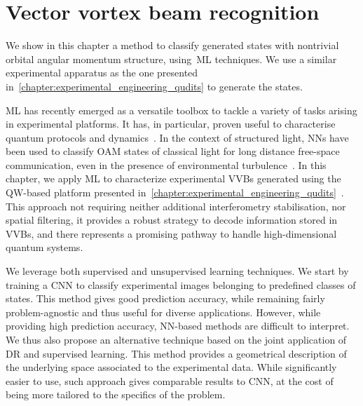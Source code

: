 
\chapter{Vector vortex beam recognition}
\label{chapter:ML_VVBs}

We show in this chapter a method to classify generated states with nontrivial orbital angular momentum structure, using~\acf{ML} techniques. We use a similar experimental apparatus as the one presented in~\cref{chapter:experimental_engineering_qudits} to generate the states.

\acf{ML} has recently emerged as a versatile toolbox to tackle a variety of tasks arising in experimental platforms. It has, in particular, proven useful to characterise quantum protocols and dynamics~\cite{carrasquilla2019reconstructing,giordani2018experimental, agresti2019pattern,lumino2018experimental,rocchetto2019experimental,butler2018machine,fischer2006predicting,melnikov2018active,wang2017experimental}.
In the context of structured light, \acfp{NN} have been used to classify \ac{OAM} states of classical light for long distance free-space communication, even in the presence of environmental turbulence~\cite{krenn2014communication,krenn2016twisted,doster2017machine,park2018demultiplexing,lohani2018turbulence,li2018joint}.
In this chapter, we apply \ac{ML} to characterize experimental \acfp{VVB} generated using the \ac{QW}-based platform presented in~\cref{chapter:experimental_engineering_qudits}~\cite{innocenti2017quantum,giordani2019experimental}.
This approach not requiring neither additional interferometry stabilisation, nor spatial filtering, it provides a robust strategy to decode information stored in \acp{VVB}, and there represents a promising pathway to handle high-dimensional quantum systems. 

We leverage both supervised and unsupervised learning techniques. We start by training a \ac{CNN} to classify experimental images belonging to predefined classes of states. This method gives good prediction accuracy, while remaining fairly problem-agnostic and thus useful for diverse applications. However, while providing high prediction accuracy, NN-based methods are difficult to interpret.
We thus also propose an alternative technique based on the joint application of \ac{DR} and supervised learning.
This method provides a geometrical description of the underlying space associated to the experimental data.
While significantly easier to use, such approach gives comparable results to CNN,
at the cost of being more tailored to the specifics of the problem.

